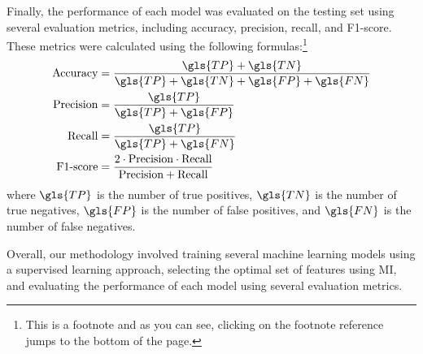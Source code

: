 Finally, the performance of each model was evaluated on the testing set using several evaluation metrics, including accuracy, precision, recall, and F1-score. These metrics were calculated using the following formulas:\footnote{This is a footnote and as you can see, clicking on the footnote reference jumps to the bottom of the page.}
\begin{align}
	\text{Accuracy}  &= \frac{\gls{TP} + \gls{TN}}{\gls{TP} + \gls{TN} + \gls{FP} + \gls{FN}} \\
	\text{Precision} &= \frac{\gls{TP}}{\gls{TP} + \gls{FP}} \\
	\text{Recall}    &= \frac{\gls{TP}}{\gls{TP} + \gls{FN}} \\
	\text{F1-score}  &= \frac{2 \cdot \text{Precision} \cdot \text{Recall}}{\text{Precision} + \text{Recall}}
\end{align}
where \(\gls{TP}\) is the number of true positives, \(\gls{TN}\) is the number of true negatives, \(\gls{FP}\) is the number of false positives, and \(\gls{FN}\) is the number of false negatives.

Overall, our methodology involved training several machine learning models using a supervised learning approach, selecting the optimal set of features using \ac{MI}, and evaluating the performance of each model using several evaluation metrics.
